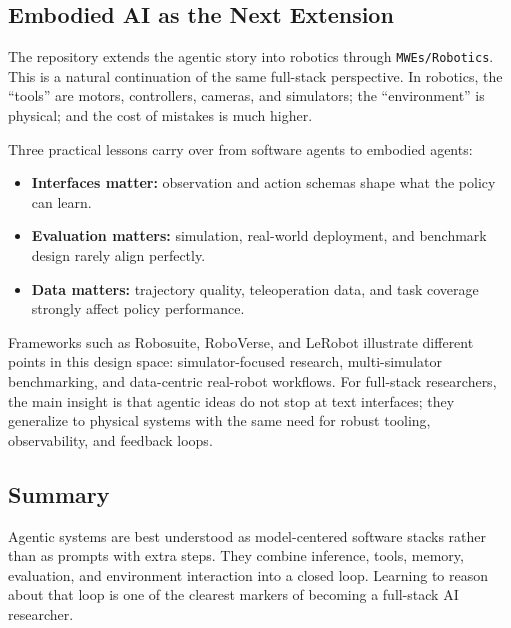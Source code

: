\documentclass[class=article,crop=false]{standalone}
\begin{document}
\subsection{Embodied AI as the Next Extension}
\label{sec:agents:embodied}

The repository extends the agentic story into robotics through \texttt{MWEs/Robotics}. This is a natural continuation of the same full-stack perspective. In robotics, the ``tools'' are motors, controllers, cameras, and simulators; the ``environment'' is physical; and the cost of mistakes is much higher.

Three practical lessons carry over from software agents to embodied agents:
\begin{itemize}
  \item \textbf{Interfaces matter:} observation and action schemas shape what the policy can learn.
  \item \textbf{Evaluation matters:} simulation, real-world deployment, and benchmark design rarely align perfectly.
  \item \textbf{Data matters:} trajectory quality, teleoperation data, and task coverage strongly affect policy performance.
\end{itemize}

Frameworks such as Robosuite, RoboVerse, and LeRobot illustrate different points in this design space: simulator-focused research, multi-simulator benchmarking, and data-centric real-robot workflows. For full-stack researchers, the main insight is that agentic ideas do not stop at text interfaces; they generalize to physical systems with the same need for robust tooling, observability, and feedback loops.

\subsection{Summary}
\label{sec:agents:summary}

Agentic systems are best understood as model-centered software stacks rather than as prompts with extra steps. They combine inference, tools, memory, evaluation, and environment interaction into a closed loop. Learning to reason about that loop is one of the clearest markers of becoming a full-stack AI researcher.
\end{document}
